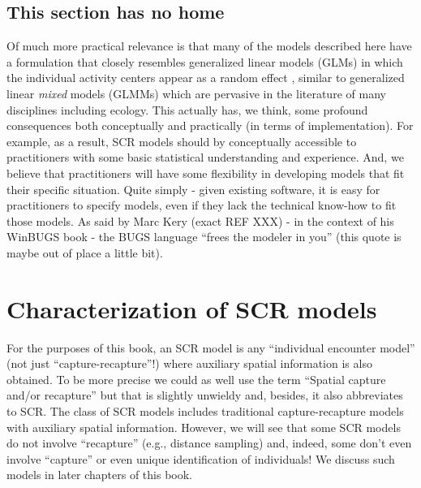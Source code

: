 \subsection{This section has no home}

Of much more practical relevance is that many of the models described
here have a formulation that closely resembles generalized linear
models (GLMs) in which the individual activity centers appear as a
random effect \citep{royle_etal:2009, royle_gardner:2011}, similar to
generalized linear {\it mixed} models (GLMMs) which are pervasive in
the literature of many disciplines including ecology.  This actually
has, we think, some profound consequences both conceptually and
practically (in terms of implementation). For example, as a result,
SCR models should by conceptually accessible to practitioners with
some basic statistical understanding and experience.  And, we believe
that practitioners will have some flexibility in developing models
that fit their specific situation. Quite simply - given existing
software, it is easy for practitioners to specify models, even if they
lack the technical know-how to fit those models. As said by Marc Kery
(exact REF XXX) - in the context of his WinBUGS book - the BUGS
language ``frees the modeler in you'' (this quote is maybe out of
place a little bit).



\section{Characterization of SCR models}

For the purposes of this book, an SCR model is any ``individual
encounter model'' (not just ``capture-recapture''!) where auxiliary
spatial information is also obtained. To be more precise we could as
well use the term ``Spatial capture and/or recapture'' but that is
slightly unwieldy and, besides, it also abbreviates to SCR. The class
of SCR models includes traditional capture-recapture models with
auxiliary spatial information. However, we will see that some SCR
models do not involve ``recapture'' (e.g., distance sampling) and,
indeed, some don't even involve ``capture'' or even unique
identification of individuals! We discuss such models in later
chapters of this book.

